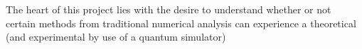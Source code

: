 The heart of this project lies with the desire to understand whether or not certain methods from traditional numerical analysis can experience a theoretical (and experimental by use of a quantum simulator)